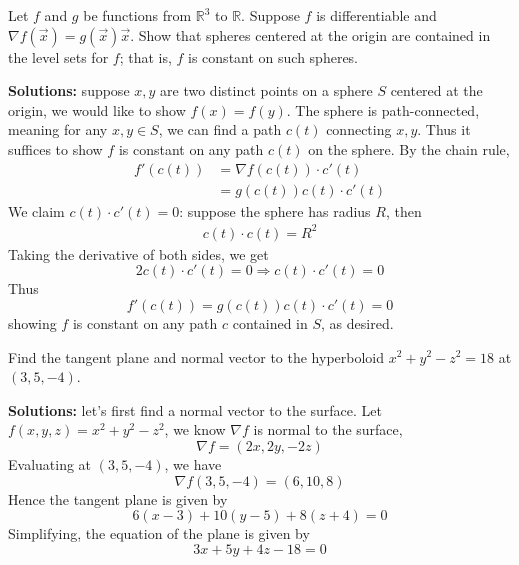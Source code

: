\documentclass[openany]{book}
\begin{document}
\begin{prob}
Let \( f \) and \( g \) be functions from \( \mathbb{R}^{3} \) to \( \mathbb{R} \). Suppose \( f \) is differentiable and \( \nabla f(\vec{x}) = g(\vec{x})\vec{x} \). Show that spheres centered at the origin are contained in the level sets for \( f \); that is, \( f \) is constant on such spheres.
\end{prob}
\textbf{Solutions:} suppose $x,y$ are two distinct points on a sphere $S$ centered at the origin, we would like to show $f(x)=f(y)$. The sphere is path-connected, meaning for any $x,y\in S$, we can find a path $c(t)$ connecting $x,y$. Thus it suffices to show $f$ is constant on any path $c(t)$ on the sphere. By the chain rule,
\begin{align*}
    f'(c(t))&=\nabla f(c(t))\cdot c'(t)\\
    &=g(c(t))c(t)\cdot c'(t)
\end{align*}
We claim $c(t)\cdot c'(t)=0$: suppose the sphere has radius $R$, then
\begin{align*}
    c(t)\cdot c(t)=R^2
\end{align*}
Taking the derivative of both sides, we get 
\begin{equation*}
    2c(t)\cdot c'(t)=0\Rightarrow c(t)\cdot c'(t)=0
\end{equation*}
Thus 
\begin{equation*}
    f'(c(t))=g(c(t))c(t)\cdot c'(t)=0
\end{equation*}
showing $f$ is constant on any path $c$ contained in $S$, as desired.





\begin{prob}
Find the tangent plane and normal vector to the hyperboloid \( x^{2} + y^{2} - z^{2} = 18 \) at \((3, 5, -4)\).
\end{prob}
\textbf{Solutions:} let's first find a normal vector to the surface. Let $f(x,y,z)=x^2+y^2-z^2$, we know $\nabla f$ is normal to the surface,
\begin{equation*}
    \nabla f=(2x, 2y, -2z)
\end{equation*}
Evaluating at $(3,5,-4)$, we have 
\begin{equation*}
    \nabla f(3, 5, -4)=(6, 10, 8)
\end{equation*}
Hence the tangent plane is given by 
\begin{equation*}
    6(x-3)+10(y-5)+8(z+4)=0
\end{equation*}
Simplifying, the equation of the plane is given by
\begin{equation*}
    3x+5y+4z-18=0
\end{equation*}
\end{document}
